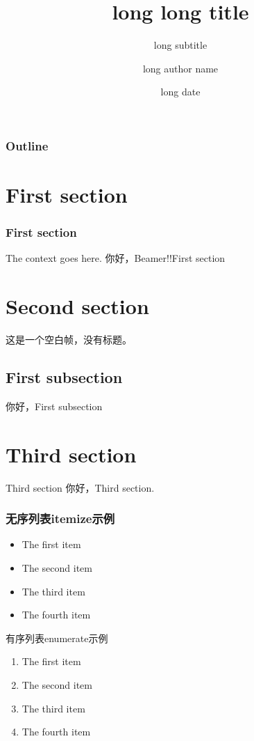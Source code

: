 \documentclass[11pt]{beamer} %
\title[short title]{long long title}
\subtitle[short subtitle]{long subtitle}
\author[short author name]{long author name}
\date[short date]{long date}
\institute[short Ins name]{long ins name}
\begin{document}
	
	\frame{\titlepage} %
	
	\begin{frame}\frametitle{Outline}  %
	\tableofcontents[pausesections]
	\end{frame}
	
	\section{First section}
	\begin{frame}[c]\frametitle{First section}
	The context goes here.   %
	你好，Beamer!!First section
	\end{frame}

	\section{Second section}
	\begin{frame}[plain]
	这是一个空白帧，没有标题。

	\subsection{First subsection}
	你好，First subsection
	\end{frame}
	
	\section*{Third section}\centering  %
	\begin{frame}[c]{Third section}
	你好，Third section.
	\end{frame}

	\begin{frame}[c]\frametitle{无序列表itemize示例}
	\begin{itemize}		%
		\item The first item
		\item The second item
		\item The third item
		\item The fourth item
	\end{itemize}
	\end{frame}

	\begin{frame}[c]{有序列表enumerate示例}
	\begin{enumerate}	%
		\item The first item
		\item The second item
		\item The third item
		\item The fourth item
	\end{enumerate}
	\end{frame}
\end{document}

